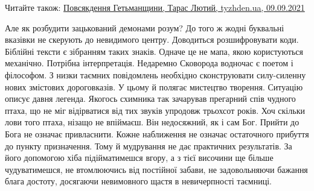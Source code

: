 Читайте також: \href{https://tyzhden.ua/Columns/50/253010}{%
Повсякдення Гетьманщини, Тарас Лютий, tyzhden.ua, 09.09.2021}

Але як розбудити зацькований демонами розум? До того ж жодні буквальні вказівки
не скерують до невидимого центру. Доводиться розшифровувати коди. Біблійні
тексти є зібранням таких знаків. Одначе це не мапа, якою користуються
механічно. Потрібна інтерпретація. Недаремно Сковорода водночас є поетом і
філософом. З низки таємних повідомлень необхідно сконструювати силу-силенну
нових змістових дороговказів. У цьому й полягає мистецтво творення. Ситуацію
описує давня легенда. Якогось схимника так зачарував прегарний спів чудного
птаха, що не міг відірватися від тих звуків упродовж трьохсот років. Хоч
скільки лови того птаха, нізащо не впіймаєш. Він недосяжний, як і сам Бог.
Прийти до Бога не означає привласнити. Кожне наближення не означає остаточного
прибуття до пункту призначення. Тому й мудрування не дає практичних
результатів. За його допомогою хіба підійматимешся вгору, а з тієї височини ще
більше чудуватимешся, не втомлюючись від постійної забави, не задовольняючи
бажання блага достоту, досягаючи невимовного щастя в невичерпності таємниці. 
